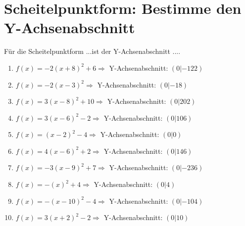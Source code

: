 \documentclass{article}%
\begin{document}
%
\section{Scheitelpunktform: Bestimme den Y{-}Achsenabschnitt}%
\label{sec:ScheitelpunktformBestimmedenY{-}Achsenabschnitt}%
Für die Scheitelpunktform ...ist der Y{-}Achsenabschnitt ....%
\begin{enumerate}[label=\alph*)]%
\item%
\newline\vspace{0.5cm}$f(x)=-2(x+8)^2 +6 \Rightarrow $ Y-Achsenabschnitt: $ (0|-122) $%
\item%
\newline\vspace{0.5cm}$f(x)=-2(x-3)^2 \Rightarrow $ Y-Achsenabschnitt: $ (0|-18) $%
\item%
\newline\vspace{0.5cm}$f(x)=3(x-8)^2 +10 \Rightarrow $ Y-Achsenabschnitt: $ (0|202) $%
\item%
\newline\vspace{0.5cm}$f(x)=3(x-6)^2 -2 \Rightarrow $ Y-Achsenabschnitt: $ (0|106) $%
\item%
\newline\vspace{0.5cm}$f(x)=(x-2)^2 -4 \Rightarrow $ Y-Achsenabschnitt: $ (0|0) $%
\item%
\newline\vspace{0.5cm}$f(x)=4(x-6)^2 +2 \Rightarrow $ Y-Achsenabschnitt: $ (0|146) $%
\item%
\newline\vspace{0.5cm}$f(x)=-3(x-9)^2 +7 \Rightarrow $ Y-Achsenabschnitt: $ (0|-236) $%
\item%
\newline\vspace{0.5cm}$f(x)=-(x)^2 +4 \Rightarrow $ Y-Achsenabschnitt: $ (0|4) $%
\item%
\newline\vspace{0.5cm}$f(x)=-(x-10)^2 -4 \Rightarrow $ Y-Achsenabschnitt: $ (0|-104) $%
\item%
\newline\vspace{0.5cm}$f(x)=3(x+2)^2 -2 \Rightarrow $ Y-Achsenabschnitt: $ (0|10) $%
\end{enumerate}
\end{document}
